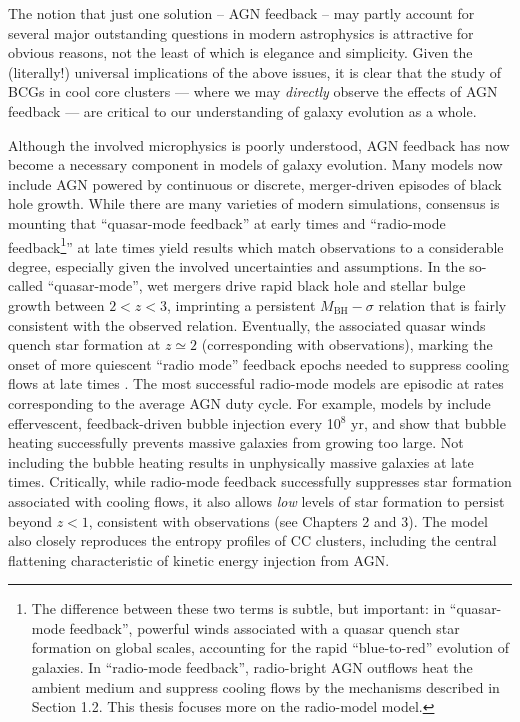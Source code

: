 The notion that just one solution -- AGN feedback -- may partly account for several major outstanding 
questions in modern astrophysics is attractive for obvious reasons, 
not the least of which is elegance and simplicity. Given the (literally!) universal implications of the above 
issues, it is clear that the study of BCGs in cool core clusters --- where we may {\it directly} observe the effects of AGN feedback --- are critical to our understanding of galaxy evolution as a whole. 


Although the involved microphysics is poorly understood, AGN feedback has now become a necessary 
component in models of galaxy evolution. 
Many models now include AGN powered by continuous or discrete, merger-driven episodes of black hole growth. 
While there are many varieties of modern simulations, consensus is mounting that ``quasar-mode feedback'' at early times  
and ``radio-mode feedback\footnote{The difference between these two terms is subtle, but important: in ``quasar-mode feedback'', powerful winds associated with a quasar 
quench star formation on global scales, accounting for the rapid ``blue-to-red'' evolution of galaxies. In ``radio-mode feedback'', radio-bright AGN outflows heat the ambient medium and suppress cooling flows by the mechanisms 
described in Section 1.2. This thesis focuses more on the radio-model model.}'' at late times yield results which match observations to a considerable degree, especially 
given the involved uncertainties and assumptions. 
In the so-called 
``quasar-mode'', wet mergers drive rapid black hole and stellar bulge growth between $2 < z < 3$, imprinting a persistent   
$M_\mathrm{BH}-\sigma$ relation that is fairly consistent with the observed relation. 
Eventually, the associated quasar winds quench star formation at $z\simeq2$ (corresponding with observations),  
marking the onset of more quiescent ``radio mode'' feedback epochs needed to suppress cooling flows at late times \citep{springel05,dimatteo05,sijacki06,croton06}.  
The most successful radio-mode models are episodic at rates corresponding to the average AGN duty cycle. 
For example, models by \citet{sijacki06} include effervescent, feedback-driven bubble injection every 10$^{8}$ yr, and show  
that bubble heating successfully prevents massive galaxies from growing too large. Not including the bubble heating 
results in unphysically massive galaxies at late times. Critically, while radio-mode feedback successfully suppresses star formation 
associated with cooling flows, it also allows {\it low} levels of star formation to persist beyond $z<1$, consistent with observations (see Chapters 2 and 3). 
The \citet{sijacki06} model also closely reproduces the entropy profiles of CC clusters, including the central 
flattening characteristic of kinetic energy injection from AGN.  









